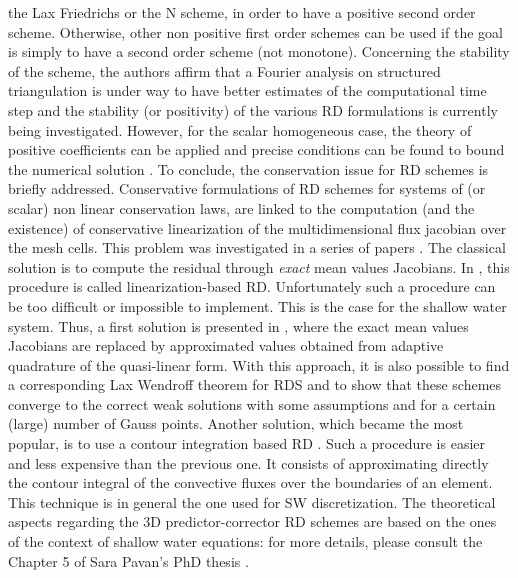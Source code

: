 the Lax Friedrichs or the N scheme, in order to have a positive second order scheme. Otherwise, other non positive first order schemes can
be used if the goal is simply to have a second order scheme (not monotone). 
Concerning the stability of the scheme, the authors affirm that a Fourier analysis on structured triangulation is
under way to have better estimates of the computational time step and the stability (or positivity) of the various RD formulations
is currently being investigated.
However, for the scalar homogeneous case, the theory of positive coefficients \cite{spekreijse_multigrid_1987,stein_residual_2007}
can be applied and precise conditions can be found to bound the numerical solution \cite{ricchiuto_explicit_2015}. 
To conclude, the conservation issue for RD schemes is briefly addressed.
Conservative formulations of RD schemes for systems of (or scalar) non linear conservation laws, are linked to the computation
(and the existence) of conservative linearization of the multidimensional flux jacobian over
the mesh cells. This problem was investigated in a series of papers \cite{csik_conservative_2002,abgrall_residual_2003,ricchiuto_residual_2005,ricchiuto_application_2007}.
The classical solution is to compute the residual through \textit{exact} mean values Jacobians.
In \cite{csik_conservative_2002}, this procedure is called linearization-based RD.
Unfortunately such a procedure can be too difficult or impossible to implement. This is the case for the shallow water system.
Thus, a first solution is presented in \cite{abgrall_residual_2003}, where the exact mean
values Jacobians are replaced by approximated values obtained from adaptive quadrature of
the quasi-linear form. With this approach, it is also possible to find a corresponding
Lax Wendroff  theorem for RDS and to show that these schemes converge to the correct weak solutions
with some assumptions and for a certain (large) number of Gauss points. 
Another solution, which became the most popular, is to use a contour integration based RD \cite{csik_conservative_2002,ricchiuto_residual_2005,ricchiuto_application_2007}.
Such a procedure is easier and less expensive than the previous one. It consists of
approximating directly the contour integral of the convective fluxes over the boundaries of an element.
This technique is in general the one used for SW discretization. The theoretical aspects regarding the 3D predictor-corrector RD schemes
are based on the ones of the context of shallow water equations: for more details, please consult the Chapter 5 of Sara Pavan's PhD
thesis \cite{Pavan2016}.

